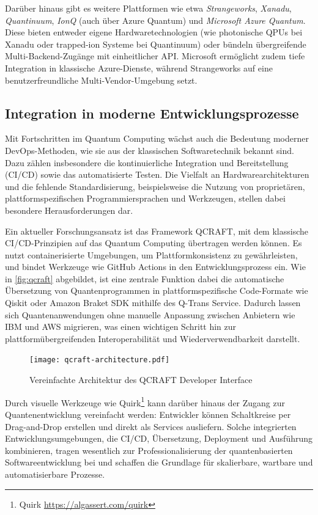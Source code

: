Darüber hinaus gibt es weitere Plattformen wie etwa \textit{Strangeworks}, \textit{Xanadu}, \textit{Quantinuum}, \textit{IonQ} (auch über Azure Quantum) und \textit{Microsoft Azure Quantum}. Diese bieten entweder eigene Hardwaretechnologien (wie photonische QPUs bei Xanadu oder trapped-ion Systeme bei Quantinuum) oder bündeln übergreifende Multi-Backend-Zugänge mit einheitlicher API. Microsoft ermöglicht zudem tiefe Integration in klassische Azure-Dienste, während Strangeworks auf eine benutzerfreundliche Multi-Vendor-Umgebung setzt.

\subsection{Integration in moderne Entwicklungsprozesse}
\label{sec:integration-devops}

Mit Fortschritten im Quantum Computing wächst auch die Bedeutung moderner DevOps-Methoden, wie sie aus der klassischen Softwaretechnik bekannt sind. Dazu zählen insbesondere die kontinuierliche Integration und Bereitstellung (CI/CD) sowie das automatisierte Testen. Die Vielfalt an Hardwarearchitekturen und die fehlende Standardisierung, beispielsweise die Nutzung von proprietären, plattformspezifischen Programmiersprachen und Werkzeugen, stellen dabei besondere Herausforderungen dar.

Ein aktueller Forschungsansatz ist das Framework QCRAFT, mit dem klassische CI/CD-Prinzipien auf das Quantum Computing übertragen werden können. Es nutzt containerisierte Umgebungen, um Plattformkonsistenz zu gewährleisten, und bindet Werkzeuge wie GitHub Actions in den Entwicklungsprozess ein. Wie in \autoref{fig:qcraft} abgebildet, ist eine zentrale Funktion dabei die automatische Übersetzung von Quantenprogrammen in plattformspezifische Code-Formate wie Qiskit oder Amazon Braket SDK mithilfe des Q-Trans Service. Dadurch lassen sich Quantenanwendungen ohne manuelle Anpassung zwischen Anbietern wie IBM und AWS migrieren, was einen wichtigen Schritt hin zur plattformübergreifenden Interoperabilität und Wiederverwendbarkeit darstellt.

\begin{figure}[ht!]
  \centering
  \texttt{[image: qcraft-architecture.pdf]}
  \caption{Vereinfachte Architektur des QCRAFT Developer Interface \autocite{romero-alvarez_qcraft_2025}}
  \label{fig:qcraft}
\end{figure}

Durch visuelle Werkzeuge wie Quirk\footnote{Quirk \url{https://algassert.com/quirk}} kann darüber hinaus der Zugang zur Quantenentwicklung vereinfacht werden: Entwickler können Schaltkreise per Drag-and-Drop erstellen und direkt als Services ausliefern. Solche integrierten Entwicklungsumgebungen, die CI/CD, Übersetzung, Deployment und Ausführung kombinieren, tragen wesentlich zur Professionalisierung der quantenbasierten Softwareentwicklung bei und schaffen die Grundlage für skalierbare, wartbare und automatisierbare Prozesse. \autocite{romero-alvarez_qcraft_2025}

